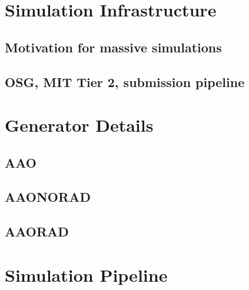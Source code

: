 \section{Simulation Infrastructure}
    \subsection{Motivation for massive simulations}
    \subsection{OSG, MIT Tier 2, submission pipeline}

\section{Generator Details}
    \subsection{AAO}
        \subsection{AAONORAD}
        \subsection{AAORAD}

\section{Simulation Pipeline}